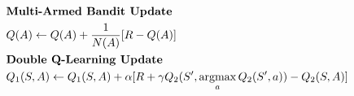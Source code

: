 \documentclass{article}
\DeclareMathOperator*{\argmax}{argmax}
\begin{document}
\begin{align*}
	 & \text{\textbf{Multi-Armed Bandit Update}}                                                                                                               \\
	 & Q(A) \leftarrow Q(A) + \frac{1}{N(A)}[R - Q(A)]                                                                                                         \\
	 & \text{\textbf{Double Q-Learning Update}}                                                                                                                \\
	 & Q_1(S,A) \leftarrow Q_1(S,A) + \alpha[R + \gamma Q_2(S', \argmax_a Q_2(S',a)) - Q_2(S,A)]
\end{align*}








\end{document}
